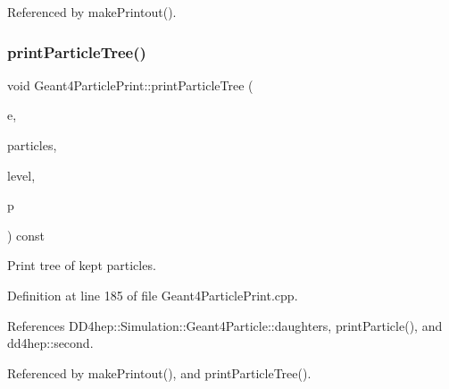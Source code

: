 Referenced by make\+Printout().

\hypertarget{class_d_d4hep_1_1_simulation_1_1_geant4_particle_print_ab614646d1d451ef3fe9aa15856a74b8d}{}\label{class_d_d4hep_1_1_simulation_1_1_geant4_particle_print_ab614646d1d451ef3fe9aa15856a74b8d} 
\subsubsection{\texorpdfstring{print\+Particle\+Tree()}{printParticleTree()}\hspace{0.1cm}{\footnotesize\ttfamily [1/2]}}
{\footnotesize\ttfamily void Geant4\+Particle\+Print\+::print\+Particle\+Tree (\begin{DoxyParamCaption}\item[{const G4\+Event $\ast$}]{e,  }\item[{const \hyperlink{class_d_d4hep_1_1_simulation_1_1_geant4_particle_print_a1c6a9ccb9393484ee16c7cd344e20f4a}{Particle\+Map} \&}]{particles,  }\item[{int}]{level,  }\item[{\hyperlink{class_d_d4hep_1_1_simulation_1_1_geant4_particle_handle}{Geant4\+Particle\+Handle}}]{p }\end{DoxyParamCaption}) const\hspace{0.3cm}{\ttfamily [protected]}}



Print tree of kept particles. 



Definition at line 185 of file Geant4\+Particle\+Print.\+cpp.



References D\+D4hep\+::\+Simulation\+::\+Geant4\+Particle\+::daughters, print\+Particle(), and dd4hep\+::second.



Referenced by make\+Printout(), and print\+Particle\+Tree().

\hypertarget{class_d_d4hep_1_1_simulation_1_1_geant4_particle_print_a8582a12abba60c9183278b37219599fc}{}\label{class_d_d4hep_1_1_simulation_1_1_geant4_particle_print_a8582a12abba60c9183278b37219599fc} 
